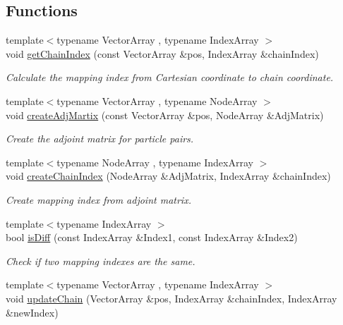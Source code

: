 \subsection*{Functions}
\begin{DoxyCompactItemize}
\item 
{\footnotesize template$<$typename Vector\+Array , typename Index\+Array $>$ }\\void \mbox{\hyperlink{namespace_space_h_1_1chain_a9f1ed51f097bc8cf691a87b97639dde9}{get\+Chain\+Index}} (const Vector\+Array \&pos, Index\+Array \&chain\+Index)
\begin{DoxyCompactList}\small\item\em Calculate the mapping index from Cartesian coordinate to chain coordinate. \end{DoxyCompactList}\item 
{\footnotesize template$<$typename Vector\+Array , typename Node\+Array $>$ }\\void \mbox{\hyperlink{namespace_space_h_1_1chain_a8d2f8c8026f24294d16309c4f2e11fdb}{create\+Adj\+Martix}} (const Vector\+Array \&pos, Node\+Array \&Adj\+Matrix)
\begin{DoxyCompactList}\small\item\em Create the adjoint matrix for particle pairs. \end{DoxyCompactList}\item 
{\footnotesize template$<$typename Node\+Array , typename Index\+Array $>$ }\\void \mbox{\hyperlink{namespace_space_h_1_1chain_a65d906373401066033d8e4a6ad581cce}{create\+Chain\+Index}} (Node\+Array \&Adj\+Matrix, Index\+Array \&chain\+Index)
\begin{DoxyCompactList}\small\item\em Create mapping index from adjoint matrix. \end{DoxyCompactList}\item 
{\footnotesize template$<$typename Index\+Array $>$ }\\bool \mbox{\hyperlink{namespace_space_h_1_1chain_ab54ce920a542c01625ee7d6c625cc5c4}{is\+Diff}} (const Index\+Array \&Index1, const Index\+Array \&Index2)
\begin{DoxyCompactList}\small\item\em Check if two mapping indexes are the same. \end{DoxyCompactList}\item 
{\footnotesize template$<$typename Vector\+Array , typename Index\+Array $>$ }\\void \mbox{\hyperlink{namespace_space_h_1_1chain_a631ad6a37f246a0db64e5879825a6878}{update\+Chain}} (Vector\+Array \&pos, Index\+Array \&chain\+Index, Index\+Array \&new\+Index)

\end{DoxyCompactItemize}
